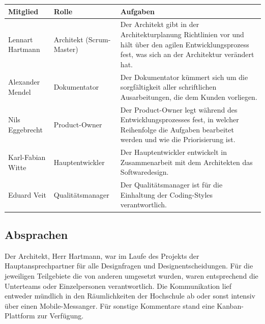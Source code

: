 \documentclass[
   draft=false
  ,paper=a4
  ,twoside=true
  ,fontsize=11pt
  ,headsepline
  ,DIV11
  ,parskip=full+
]{scrartcl} %
\begin{document}
 \begin{longtable}{|p{} p{} p{}|}
	\hline
	\textbf{Mitglied} & \textbf{Rolle} & \textbf{Aufgaben} \\ [5pt]
	\hline
	\endhead
	\hline 
	\endfoot
	
	Lennart Hartmann & Architekt (Scrum-Master) & Der Architekt gibt in der Architekturplanung Richtlinien vor und hält über den agilen Entwicklungsprozess fest, was sich an der Architektur verändert hat.

\\	\hline
	

Alexander Mendel & Dokumentator & Der Dokumentator kümmert sich um die sorgfältigkeit aller schriftlichen Ausarbeitungen, die dem Kunden vorliegen.

\\	\hline

Nils Eggebrecht & Product-Owner & Der Product-Owner legt während des Entwicklungsprozesses fest, in welcher Reihenfolge die Aufgaben bearbeitet werden und wie die Priorisierung ist.
\\	\hline

Karl-Fabian Witte & Hauptentwickler & Der Hauptentwickler entwickelt in Zusammenarbeit mit dem Architekten das Softwaredesign. 

\\ \hline

Eduard Veit & Qualitätsmanager & Der Qualitätsmanager ist für die Einhaltung der Coding-Styles verantwortlich. 

\\ \hline



\end{longtable}


\subsection{Absprachen}

Der Architekt, Herr Hartmann, war im Laufe des Projekts der Hauptansprechpartner für alle Designfragen und Designentscheidungen. Für die jeweiligen Teilgebiete die von anderen umgesetzt wurden, waren entsprechend die Unterteams oder Einzelpersonen verantwortlich. Die Kommunikation lief entweder mündlich in den Räumlichkeiten der Hochschule ab oder sonst intensiv über einen Mobile-Messanger. Für sonstige Kommentare stand eine Kanban-Plattform zur Verfügung.
\end{document}
